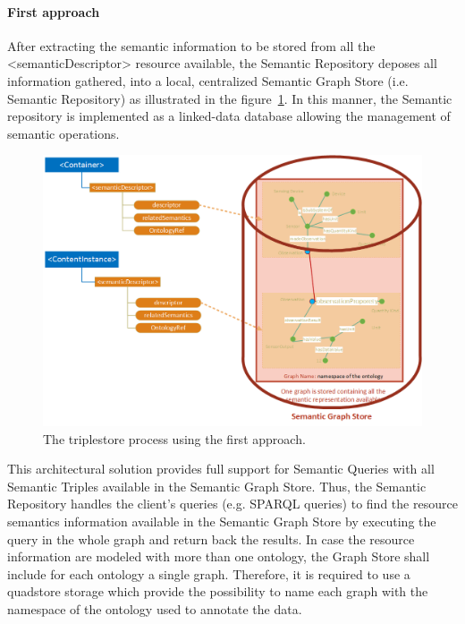 \paragraph{First approach }
After extracting the semantic information to be stored from all the <semanticDescriptor> resource available, the Semantic Repository deposes all information gathered, into a local, centralized Semantic Graph Store (i.e. Semantic Repository) as illustrated in the figure~\ref{fig:contrib2:1store}. In this manner, the Semantic repository is implemented as a linked-data database allowing the management of semantic operations.\par 
\begin{figure}[htbp]
    \centering
    \includegraphics[width=.9\textwidth]{resources/images/1store}
    \caption{The triplestore process using the first approach. }\label{fig:contrib2:1store}
\end{figure}
This architectural solution provides full support for Semantic Queries with all Semantic Triples available in the Semantic Graph Store. Thus, the Semantic Repository handles the client’s queries (e.g. SPARQL queries) to find the resource semantics information available in the Semantic Graph Store by executing the query in the whole graph and return back the results. In case the resource information are modeled with more than one ontology, the Graph Store shall include for each ontology a single graph. Therefore, it is required to use a quadstore storage which provide the possibility to name each graph with the namespace of the ontology used to annotate the data.\par 
